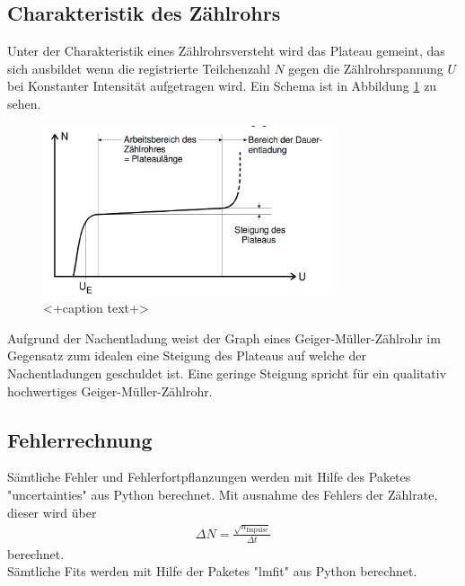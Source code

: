 \subsection{Charakteristik des Zählrohrs}
Unter der Charakteristik eines Zählrohrsversteht wird das Plateau gemeint, das sich ausbildet wenn die registrierte Teilchenzahl $N$ gegen die Zählrohrspannung $U$ bei Konstanter Intensität aufgetragen wird. Ein Schema ist in Abbildung \ref{fig:Pla} zu sehen. 
\begin{figure}
  \centering
  \includegraphics[height=5cm]{picture/Plateau.pdf}
  \caption{<+caption text+>}
  \label{fig:Pla}
\end{figure}
Aufgrund der Nachentladung weist der Graph eines Geiger-Müller-Zählrohr im Gegensatz zum idealen eine Steigung des Plateaus auf welche der Nachentladungen geschuldet ist. Eine geringe Steigung spricht für ein qualitativ hochwertiges Geiger-Müller-Zählrohr.

\subsection{Fehlerrechnung}
Sämtliche Fehler und Fehlerfortpflanzungen werden mit Hilfe des Paketes "uncertainties" \cite{uncertainties} aus Python berechnet. Mit ausnahme des Fehlers der Zählrate, dieser wird über
\begin{align*}
	\Delta N = \frac{\sqrt{n_\text{Impulse}}}{\Delta t}
\end{align*}
berechnet. \\
Sämtliche Fits werden mit Hilfe der Paketes "lmfit" \cite{lmfit} aus Python berechnet.
